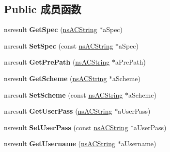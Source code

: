 \subsection*{Public 成员函数}
\begin{DoxyCompactItemize}
\item 
\mbox{\label{interfacens_i_u_r_i_add15bda3a55bef80309d90ea7d2a4785}} 
nsresult {\bfseries Get\+Spec} (\hyperlink{structns_c_string_container}{ns\+A\+C\+String} $\ast$a\+Spec)
\item 
\mbox{\label{interfacens_i_u_r_i_a22c95dcd0a3d4d168dfa5073fe9cd108}} 
nsresult {\bfseries Set\+Spec} (const \hyperlink{structns_c_string_container}{ns\+A\+C\+String} $\ast$a\+Spec)
\item 
\mbox{\label{interfacens_i_u_r_i_af49e2b5abad70e9fcdcaac084a99bd45}} 
nsresult {\bfseries Get\+Pre\+Path} (\hyperlink{structns_c_string_container}{ns\+A\+C\+String} $\ast$a\+Pre\+Path)
\item 
\mbox{\label{interfacens_i_u_r_i_ac52c534e18400ff093502451680acbfb}} 
nsresult {\bfseries Get\+Scheme} (\hyperlink{structns_c_string_container}{ns\+A\+C\+String} $\ast$a\+Scheme)
\item 
\mbox{\label{interfacens_i_u_r_i_ac4bcdb98990181311a9de96dd4097c44}} 
nsresult {\bfseries Set\+Scheme} (const \hyperlink{structns_c_string_container}{ns\+A\+C\+String} $\ast$a\+Scheme)
\item 
\mbox{\label{interfacens_i_u_r_i_a62516610dafb24789c85638468a841b1}} 
nsresult {\bfseries Get\+User\+Pass} (\hyperlink{structns_c_string_container}{ns\+A\+C\+String} $\ast$a\+User\+Pass)
\item 
\mbox{\label{interfacens_i_u_r_i_aea467fbef78c47a15ba588c770c136e8}} 
nsresult {\bfseries Set\+User\+Pass} (const \hyperlink{structns_c_string_container}{ns\+A\+C\+String} $\ast$a\+User\+Pass)
\item 
\mbox{\label{interfacens_i_u_r_i_aec4a5cf2ff002b85418bb700a93e4b93}} 
nsresult {\bfseries Get\+Username} (\hyperlink{structns_c_string_container}{ns\+A\+C\+String} $\ast$a\+Username)

\end{DoxyCompactItemize}
